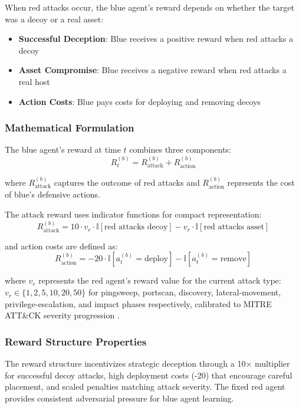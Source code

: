 \documentclass[12pt,oneside]{article}
\begin{document}
When red attacks occur, the blue agent's reward depends on whether the target was a decoy or a real asset:
\begin{itemize}
\item \textbf{Successful Deception}: Blue receives a positive reward when red attacks a decoy
\item \textbf{Asset Compromise}: Blue receives a negative reward when red attacks a real host
\item \textbf{Action Costs}: Blue pays costs for deploying and removing decoys
\end{itemize}

\subsubsection{Mathematical Formulation}

The blue agent's reward at time $t$ combines three components:
\begin{equation}
R_t^{(b)} = R_{\text{attack}}^{(b)} + R_{\text{action}}^{(b)}
\end{equation}

where $R_{\text{attack}}^{(b)}$ captures the outcome of red attacks and $R_{\text{action}}^{(b)}$ represents the cost of blue's defensive actions.

The attack reward uses indicator functions for compact representation:
\begin{equation}
R_{\text{attack}}^{(b)} = 10 \cdot v_r \cdot \mathbb{I}[\text{red attacks decoy}] - v_r \cdot \mathbb{I}[\text{red attacks asset}]
\end{equation}

and action costs are defined as:
\begin{equation}
R_{\text{action}}^{(b)} = -20 \cdot \mathbb{I}[a_t^{(b)} = \text{deploy}] - \mathbb{I}[a_t^{(b)} = \text{remove}]
\end{equation}

where $v_r$ represents the red agent's reward value for the current attack type: $v_r \in \{1, 2, 5, 10, 20, 50\}$ for pingsweep, portscan, discovery, lateral-movement, privilege-escalation, and impact phases respectively, calibrated to MITRE ATT\&CK severity progression \cite{mitre_attack_2023}.

\subsubsection{Reward Structure Properties}

The reward structure incentivizes strategic deception through a 10× multiplier for successful decoy attacks, high deployment costs (-20) that encourage careful placement, and scaled penalties matching attack severity. The fixed red agent provides consistent adversarial pressure for blue agent learning.
\end{document}
